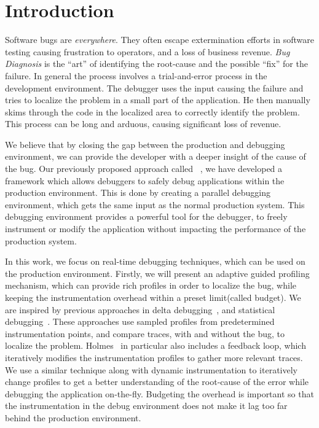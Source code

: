 \section{Introduction}
\label{sec:introduction}

Software bugs are \emph{everywhere}.
They often escape extermination efforts in software testing causing frustration to operators, and a loss of business revenue.
\emph{Bug Diagnosis} is the ``art'' of identifying the root-cause and the possible ``fix'' for the failure.
In general the process involves a trial-and-error process in the development environment. 
The debugger uses the input causing the failure and tries to localize the problem in a small part of the application.
He then manually skims through the code in the localized area to correctly identify the problem.
This process can be long and arduous, causing significant loss of revenue.

We believe that by closing the gap between the production and debugging environment, we can provide the developer with a deeper insight of the cause of the bug.
Our previously proposed approach called \livedebugging~\cite{livedebugging}, we have developed a framework which allows debuggers to safely debug applications within the production environment.
This is done by creating a parallel debugging environment, which gets the same input as the normal production system.
This debugging environment provides a powerful tool for the debugger, to freely instrument or modify the application without impacting the performance of the production system.

In this work, we focus on real-time debugging techniques, which can be used on the production environment.
Firstly, we will present an adaptive guided profiling mechanism, which can provide rich profiles in order to localize the bug, while keeping the instrumentation overhead within a preset limit(called budget).
We are inspired by previous approaches in delta debugging~\cite{delta}, and statistical debugging~\cite{statistical, holmes}. 
These approaches use sampled profiles from predetermined instrumentation points, and compare traces, with and without the bug, to localize the problem.
Holmes~\cite{holmes} in particular also includes a feedback loop, which iteratively modifies the instrumentation profiles to gather more relevant traces.
We use a similar technique along with dynamic instrumentation to iteratively change profiles to get a better understanding of the root-cause of the error while debugging the application on-the-fly.
Budgeting the overhead is important so that the instrumentation in the debug environment does not make it lag too far behind the production environment.

